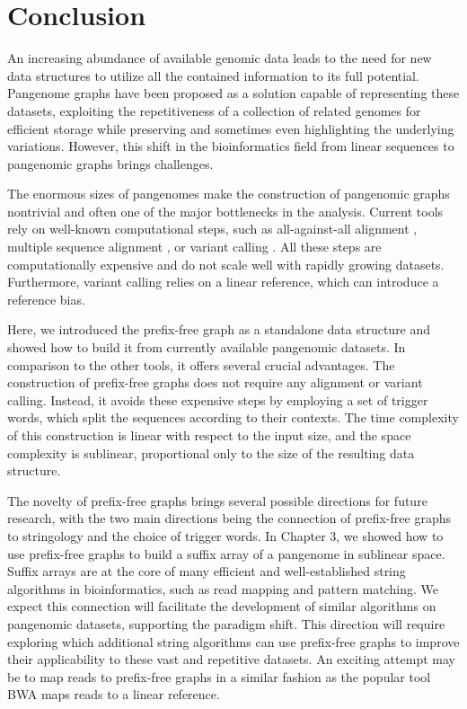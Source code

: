 \section{Conclusion}
An increasing abundance of available genomic data leads to the need for new data structures to utilize all the contained information to its full potential.
Pangenome graphs have been proposed as a solution capable of representing these datasets, exploiting the repetitiveness of a collection of related genomes for efficient storage while preserving and sometimes even highlighting the underlying variations.
However, this shift in the bioinformatics field from linear sequences to pangenomic graphs brings challenges.

The enormous sizes of pangenomes make the construction of pangenomic graphs nontrivial and often one of the major bottlenecks in the analysis.
Current tools rely on well-known computational steps, such as all-against-all alignment \cite{garrison2023building}, multiple sequence alignment \cite{hickey2023pangenome}, or variant calling \cite{garrison2018variation}.
All these steps are computationally expensive and do not scale well with rapidly growing datasets.
Furthermore, variant calling relies on a linear reference, which can introduce a reference bias.

Here, we introduced the prefix-free graph as a standalone data structure and showed how to build it from currently available pangenomic datasets.
In comparison to the other tools, it offers several crucial advantages.
The construction of prefix-free graphs does not require any alignment or variant calling.
Instead, it avoids these expensive steps by employing a set of trigger words, which split the sequences according to their contexts.
The time complexity of this construction is linear with respect to the input size, and the space complexity is sublinear, proportional only to the size of the resulting data structure.

The novelty of prefix-free graphs brings several possible directions for future research, with the two main directions being the connection of prefix-free graphs to stringology and the choice of trigger words.
In Chapter 3, we showed how to use prefix-free graphs to build a suffix array of a pangenome in sublinear space.
Suffix arrays are at the core of many efficient and well-established string algorithms in bioinformatics, such as read mapping and pattern matching.
We expect this connection will facilitate the development of similar algorithms on pangenomic datasets, supporting the paradigm shift.
This direction will require exploring which additional string algorithms can use prefix-free graphs to improve their applicability to these vast and repetitive datasets.
An exciting attempt may be to map reads to prefix-free graphs in a similar fashion as the popular tool BWA \cite{li2009fast} maps reads to a linear reference.

